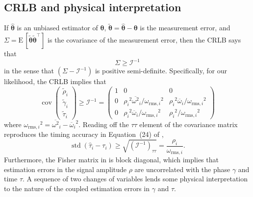 \documentclass{iopart}
\DeclareMathOperator{\cov}{cov}
\DeclareMathOperator{\std}{std}
\begin{document}
\subsection{\ac{CRLB} and physical interpretation}

If $\hat{\boldsymbol\theta}$ is an unbiased estimator of $\boldsymbol\theta$, $\tilde{\boldsymbol\theta} = \hat{\boldsymbol\theta} - \boldsymbol\theta$ is the measurement error, and $\Sigma = \mathrm{E} \, [\tilde{\boldsymbol\theta}\tilde{\boldsymbol\theta}^\intercal]$ is the covariance of the measurement error, then the \ac{CRLB} says that
%
\begin{equation}
    \Sigma \geq \mathcal{I}^{-1}
\end{equation}
%
in the sense that $\left(\Sigma - \mathcal{I}^{-1}\right)$ is positive semi\nobreakdashes-definite. Specifically, for our likelihood, the \ac{CRLB} implies that
%
\begin{equation}\label{eq:covariance-matrix}
    \cov{
        \left(
        \begin{array}{c}
            \tilde{\rho}_i \\
            \tilde{\gamma}_i \\
            \tilde{\tau}_i
        \end{array}
        \right)
    } \geq \mathcal{I}^{-1} = \left(
        \begin{array}{ccc}
            1 & 0 & 0 \\
            0 & {\rho_i}^2 {\overline{\omega^2}}_i/{\omega_{\mathrm{rms},i}}^2 & {\rho_i}^2 {\overline{\omega}}_i/{\omega_{\mathrm{rms},i}}^2 \\
            0 & {\rho_i}^2 {\overline{\omega}}_i/{\omega_{\mathrm{rms},i}}^2 & {\rho_i}^2/{\omega_{\mathrm{rms},i}}^2
        \end{array}
    \right)
\end{equation}
%
where ${\omega_{\mathrm{rms},i}}^2 = {\overline{\omega^2}}_i - {{\overline{\omega}}_i}^2$. Reading off the $\tau \tau$ element of the covariance matrix reproduces the timing accuracy in Equation~(24) of \cite{fairhurst:2009},
%
\begin{equation}\label{eq:timing-crlb}
    \std \left(\hat{\tau}_i - \tau_i \right) \geq \sqrt{\left(\mathcal{I}^{-1}\right)_{\tau\tau}} = \frac{\rho_i}{\omega_{\mathrm{rms},i}}.
\end{equation}
%
Furthermore, the Fisher matrix in  is block diagonal, which implies that estimation errors in the signal amplitude $\rho$ are uncorrelated with the phase $\gamma$ and time $\tau$. A sequence of two changes of variables lends some physical interpretation to the nature of the coupled estimation errors in $\gamma$ and $\tau$.
\end{document}
